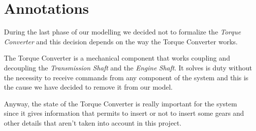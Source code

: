 \section{Annotations}
\label{Section:Annotations}
During the last phase of our modelling we decided not to formalize the \emph{Torque Converter} and this decision depends on the way the Torque Converter works.

The Torque Converter is a mechanical component that works coupling and decoupling the \emph{Transmission Shaft} and the \emph{Engine Shaft}. It solves is duty without the necessity to receive commands from any component of the system and this is the cause we have decided to remove it from our model.

Anyway, the state of the Torque Converter is really important for the system since it gives information that permits to insert or not to insert some gears and other details that aren't taken into account in this project.